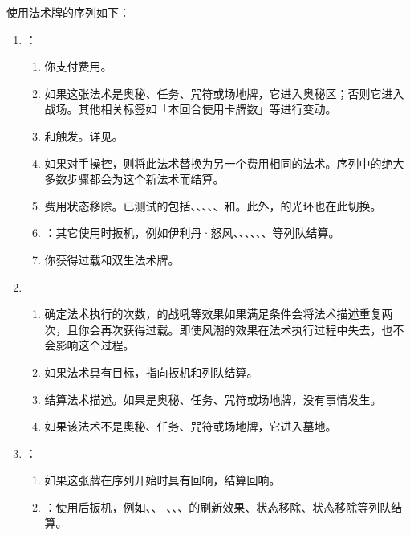 使用法术牌的序列如下：
\begin{enumerate}
    \item {}：
    \begin{enumerate}
        \item 你支付费用。
        \item 如果这张法术是奥秘、任务、咒符或场地牌，它进入奥秘区；否则它进入战场。其他相关标签如「本回合使用卡牌数」等进行变动。
        \item {}和触发。详见。
        \item 如果对手操控，则将此法术替换为另一个费用相同的法术。序列中的绝大多数步骤都会为这个新法术而结算。
        \item 费用状态移除。已测试的包括、、、、、和。此外，的光环也在此切换。
        \item {}：其它使用时扳机，例如伊利丹·怒风、、、、、、等列队结算。
        \item 你获得过载和双生法术牌。
    \end{enumerate}

    \item {}
    \begin{enumerate}
        \item 确定法术执行的次数，的战吼等效果如果满足条件会将法术描述重复两次，且你会再次获得过载。即使风潮的效果在法术执行过程中失去，也不会影响这个过程。
        \item 如果法术具有目标，指向扳机和列队结算。
        \item 结算法术描述。如果是奥秘、任务、咒符或场地牌，没有事情发生。
        \item 如果该法术不是奥秘、任务、咒符或场地牌，它进入墓地。
    \end{enumerate}

    \item {}：
    \begin{enumerate}
        \item 如果这张牌在序列开始时具有回响，结算回响。
        \item {}：使用后扳机，例如、、 、、、的刷新效果、状态移除、状态移除等列队结算。
    \end{enumerate}
\end{enumerate}

